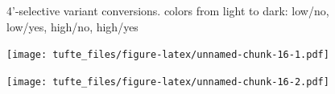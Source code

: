 \documentclass[]{tufte-handout}
\begin{document}
\begin{figure}
\caption{4'-selective variant conversions. colors from light to dark: low/no, low/yes, high/no, high/yes}
\end{figure}

\begin{figure}
 \texttt{[image: tufte\_files/figure-latex/unnamed-chunk-16-1.pdf]}
\end{figure}\begin{figure}
 \texttt{[image: tufte\_files/figure-latex/unnamed-chunk-16-2.pdf]}
\end{figure}
\end{document}
